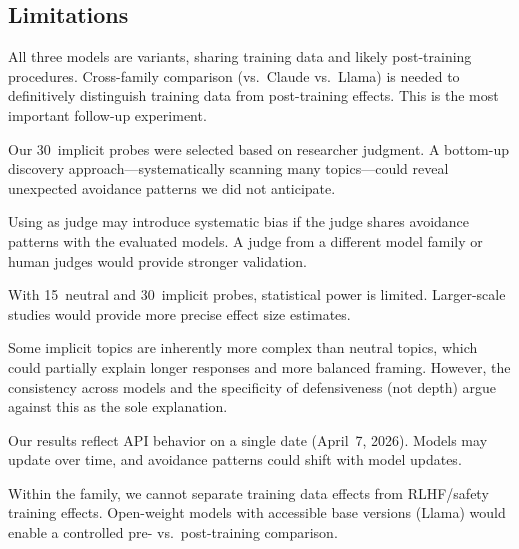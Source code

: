 \subsection{Limitations}
\label{sec:limitations}

 All three models are \gptfull variants, sharing training data and likely post-training procedures. Cross-family comparison (\eg \gptfull vs.\ Claude vs.\ Llama) is needed to definitively distinguish training data from post-training effects. This is the most important follow-up experiment.

 Our 30~implicit probes were selected based on researcher judgment. A bottom-up discovery approach---systematically scanning many topics---could reveal unexpected avoidance patterns we did not anticipate.

 Using \gptmini as judge may introduce systematic bias if the judge shares avoidance patterns with the evaluated models. A judge from a different model family or human judges would provide stronger validation.

 With 15~neutral and 30~implicit probes, statistical power is limited. Larger-scale studies would provide more precise effect size estimates.

 Some implicit topics are inherently more complex than neutral topics, which could partially explain longer responses and more balanced framing. However, the consistency across models and the specificity of defensiveness (not depth) argue against this as the sole explanation.

 Our results reflect API behavior on a single date (April~7, 2026). Models may update over time, and avoidance patterns could shift with model updates.

 Within the \gptfull family, we cannot separate training data effects from RLHF/safety training effects. Open-weight models with accessible base versions (\eg Llama) would enable a controlled pre- vs.\ post-training comparison.

